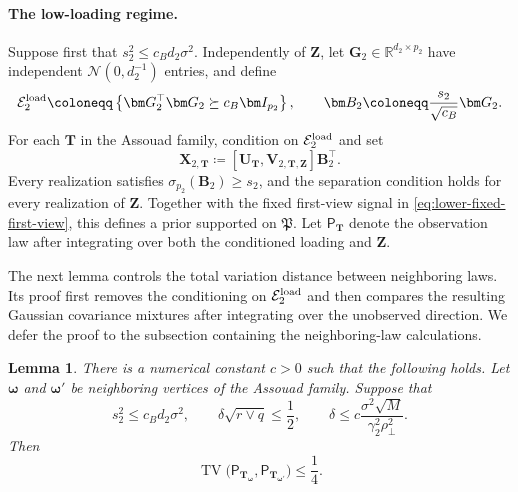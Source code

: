 \documentclass[11pt]{article}
\newtheorem{lemma}{Lemma}
\newcommand{\trans}{\top}
\begin{document}
\paragraph{The low-loading regime.}
Suppose first that $s_2^2\le c_Bd_2\sigma^2$.  Independently of $\bm Z$,
let $\bm G_2\in\mathbb R^{d_2\times p_2}$ have independent
$\mathcal N(0,d_2^{-1})$ entries, and define
\[
  \mathcal E_2^{\rm load}
  \coloneqq
  \left\{
    \bm G_2^\trans\bm G_2
    \succeq
    c_B\bm I_{p_2}
  \right\},
  \qquad
  \bm B_2
  \coloneqq
  \frac{s_2}{\sqrt{c_B}}\bm G_2.
\]
For each $\bm T$ in the Assouad family, condition on $\mathcal E_2^{\rm load}$ and set
\begin{equation}
\label{eq:lower-hidden-low-signal}
  \bm X_{2,\bm T}
  \coloneqq
  [\bm U_{\bm T},\bm V_{2,\bm T,\bm Z}]
  \bm B_2^\trans.
\end{equation}
Every realization satisfies
$\sigma_{p_2}(\bm B_2)\ge s_2$, and the separation condition holds for every
realization of $\bm Z$.  Together with the fixed first-view signal in
\cref{eq:lower-fixed-first-view}, this defines a prior supported on
$\mathfrak P$.  Let $\mathsf P_{\bm T}$ denote the observation law after
integrating over both the conditioned loading and $\bm Z$.

The next lemma controls the total variation distance between neighboring
laws.  Its proof first removes the conditioning on $\mathcal E_2^{\rm load}$ and then
compares the resulting Gaussian covariance mixtures after integrating over
the unobserved direction.  We defer the proof to the subsection containing
the neighboring-law calculations.

\begin{lemma}
\label{lem:lower-hidden-low-edge}
There is a numerical constant $c>0$ such that the following holds.  Let
$\bm\omega$ and $\bm\omega'$ be neighboring vertices of the Assouad family.
Suppose that
\[
  s_2^2\le c_Bd_2\sigma^2,
  \qquad
  \delta\sqrt{r\vee q}\le\frac12,
  \qquad
  \delta
  \le
  c\frac{\sigma^2\sqrt M}
          {\gamma_2^2\rho_\perp^2}.
\]
Then
\[
  \operatorname{TV}\bigl(
    \mathsf P_{\bm T_{\bm\omega}},
    \mathsf P_{\bm T_{\bm\omega'}}
  \bigr)
  \le\frac14.
\]
\end{lemma}
\end{document}
